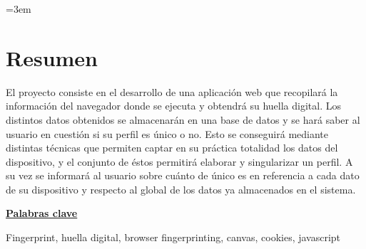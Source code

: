 \parindent=3em
\chapter*{Resumen}

El proyecto consiste en el desarrollo de una aplicación web que recopilará la información del navegador donde se ejecuta y obtendrá su huella digital. Los distintos datos obtenidos se almacenarán en una base de datos y se hará saber al usuario en cuestión si su perfil es único o no. Esto se conseguirá mediante distintas técnicas que permiten captar en su práctica totalidad los datos del dispositivo, y el conjunto de éstos permitirá elaborar y singularizar un perfil. A su vez se informará al usuario sobre cuánto de único es en referencia a cada dato de su dispositivo y respecto al global de los datos ya almacenados en el sistema. \par
\vspace{12mm}
\noindent
\underline{\Large{\textbf{Palabras clave}}}\par
\vspace{7mm}
\noindent
\normalsize{Fingerprint, huella digital, browser fingerprinting, canvas, cookies, javascript}
